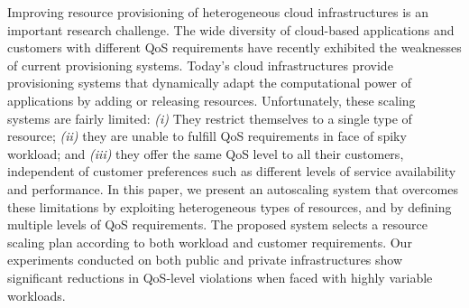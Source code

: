 Improving resource provisioning of heterogeneous cloud infrastructures is an important research challenge. The wide diversity of cloud-based applications and customers with different QoS requirements have recently exhibited the weaknesses of current provisioning systems. Today's cloud infra\-structures provide provisioning systems that dynamically adapt the computational power of applications by adding or releasing resources. Unfortunately, these scaling systems are fairly limited: \emph{(i)} They restrict themselves to a single type of resource; \emph{(ii)} they are unable to fulfill QoS requirements in face of spiky workload; and \emph{(iii)} they offer the same QoS level to all their customers, independent of customer preferences such as different levels of service availability and performance. In this paper, we present an autoscaling system that overcomes these limitations by exploiting heterogeneous types of resources, and by defining multiple levels of QoS requirements. The proposed system selects a resource scaling plan according to both workload and customer requirements. Our experiments conducted on both public and private infrastructures show significant reductions in QoS-level violations when faced with highly variable workloads.
